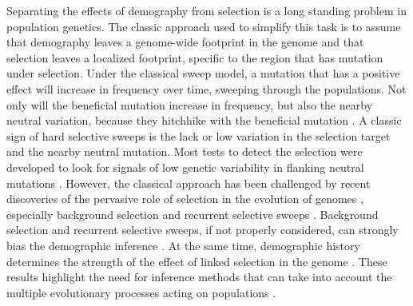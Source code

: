 \documentclass[12pt]{article}
\begin{document}
Separating the effects of demography from selection is a long standing problem in population genetics. The classic approach used to simplify this task is to assume that demography leaves a genome-wide footprint in the genome and that selection leaves a localized footprint, specific to the region that has mutation under selection. Under the classical sweep model, a mutation that has a positive effect will increase in frequency over time, sweeping through the populations. Not only will the beneficial mutation increase in frequency, but also the nearby neutral variation, because they hitchhike with the beneficial mutation \citep{Smith:1974cy,Kaplan:1989tm, Barton:2000fg}. A classic sign of hard selective sweeps is the lack or low variation in the selection target and the nearby neutral mutation. Most tests to detect the selection were developed to look for signals of low genetic variability in flanking neutral mutations \citep{Tajima:1989un, Fay:2000dl, Kim:2004ih, Nielsen:2005kx}. However, the classical approach has been challenged by recent discoveries of the pervasive role of selection in the evolution of genomes \citep{Sella:2009hs,Hernandez:2011dn, Harris:2018bm}, especially background selection \citep{Charlesworth:2012ix} and recurrent selective sweeps \citep{Lange:2018fl}. Background selection and recurrent selective sweeps, if not properly considered, can strongly bias the demographic inference \citep{Huber:2015cl, Pavlidis:2010bb, Ewing:2016gv}. At the same time, demographic history determines the strength of the effect of linked selection in the genome \citep{Jensen:2005ky, Jensen:2007jw, Schrider:2016gg}. These results highlight the need for inference methods that can take into account the multiple evolutionary processes acting on populations \citep{Lin:2011jv, Li:2012bh, Bank:2014hx}.
\end{document}

